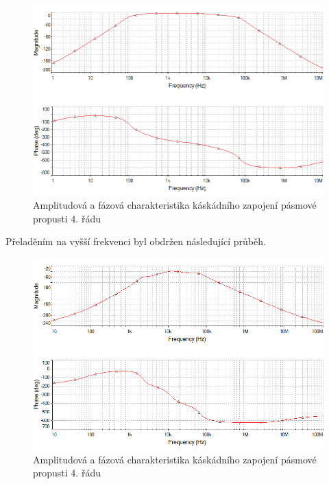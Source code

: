 \documentclass[twoside]{article}
\begin{document}
\begin{figure}[H]
\centering
\includegraphics[scale=0.6]{bp42.png}
\caption{Amplitudová a fázová charakteristika káskádního zapojení pásmové propusti 4. řádu}
\end{figure}
\noindent Přeladěním na vyšší frekvenci byl obdržen následující průběh.
\begin{figure}[H]
\centering
\includegraphics[scale=0.6]{bp4.png}
\caption{Amplitudová a fázová charakteristika káskádního zapojení pásmové propusti 4. řádu}
\end{figure}
\end{document}
